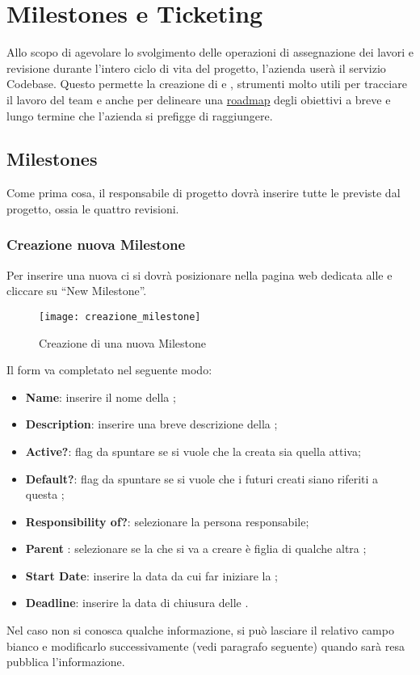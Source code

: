\newpage
\section{Milestones e Ticketing}
Allo scopo di agevolare lo svolgimento delle operazioni di assegnazione dei lavori e revisione durante l'intero ciclo di vita del progetto, l'azienda \team{} userà il servizio Codebase. Questo permette la creazione di  e \underline{}, strumenti molto utili per tracciare il lavoro del team e anche per delineare una \underline{roadmap} degli obiettivi a breve e lungo termine che l'azienda si prefigge di raggiungere.

\subsection{Milestones}
Come prima cosa, il responsabile di progetto dovrà inserire tutte le  previste dal progetto, ossia le quattro revisioni.
\subsubsection{Creazione nuova Milestone}
\label{sec:creazione_milestone}
Per inserire una nuova  ci si dovrà posizionare nella pagina web dedicata alle  e cliccare su ``New Milestone''.
\begin{figure}[h]
\texttt{[image: creazione\_milestone]}
\caption{Creazione di una nuova Milestone} \label{fig:creazione_milestone}
\end{figure}
Il form va completato nel seguente modo:
\begin{itemize}
\item \textbf{Name}: inserire il nome della ;
\item \textbf{Description}: inserire una breve descrizione della ;
\item \textbf{Active?}: flag da spuntare se si vuole che la  creata sia quella attiva;
\item \textbf{Default?}: flag da spuntare se si vuole che i futuri  creati siano riferiti a questa ;
\item \textbf{Responsibility of?}: selezionare la persona responsabile;
\item \textbf{Parent }: selezionare se la  che si va a creare è figlia di qualche altra ;
\item \textbf{Start Date}: inserire la data da cui far iniziare la ;
\item \textbf{Deadline}: inserire la data di chiusura delle .
\end{itemize}
Nel caso non si conosca qualche informazione, si può lasciare il relativo campo bianco e modificarlo successivamente (vedi paragrafo seguente) quando sarà resa pubblica l'informazione.

